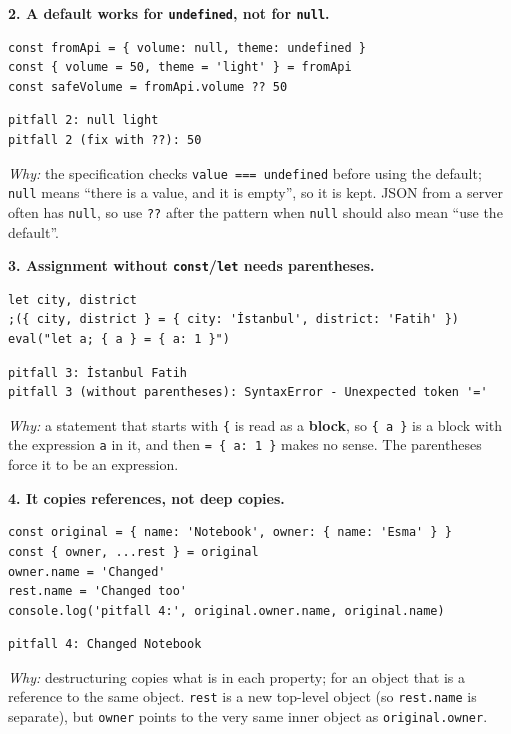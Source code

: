 \documentclass[
  10pt,
]{article}
\begin{document}
\textbf{2. A default works for \texttt{undefined}, not for
\texttt{null}.}

\begin{verbatim}
const fromApi = { volume: null, theme: undefined }
const { volume = 50, theme = 'light' } = fromApi
const safeVolume = fromApi.volume ?? 50
\end{verbatim}

\begin{verbatim}
pitfall 2: null light
pitfall 2 (fix with ??): 50
\end{verbatim}

\emph{Why:} the specification checks \texttt{value\ ===\ undefined}
before using the default; \texttt{null} means ``there is a value, and it
is empty'', so it is kept. JSON from a server often has \texttt{null},
so use \texttt{??} after the pattern when \texttt{null} should also mean
``use the default''.

\textbf{3. Assignment without \texttt{const}/\texttt{let} needs
parentheses.}

\begin{verbatim}
let city, district
;({ city, district } = { city: 'İstanbul', district: 'Fatih' })
eval("let a; { a } = { a: 1 }")
\end{verbatim}

\begin{verbatim}
pitfall 3: İstanbul Fatih
pitfall 3 (without parentheses): SyntaxError - Unexpected token '='
\end{verbatim}

\emph{Why:} a statement that starts with \texttt{\{} is read as a
\textbf{block}, so \texttt{\{\ a\ \}} is a block with the expression
\texttt{a} in it, and then \texttt{=\ \{\ a:\ 1\ \}} makes no sense. The
parentheses force it to be an expression.

\textbf{4. It copies references, not deep copies.}

\begin{verbatim}
const original = { name: 'Notebook', owner: { name: 'Esma' } }
const { owner, ...rest } = original
owner.name = 'Changed'
rest.name = 'Changed too'
console.log('pitfall 4:', original.owner.name, original.name)
\end{verbatim}

\begin{verbatim}
pitfall 4: Changed Notebook
\end{verbatim}

\emph{Why:} destructuring copies what is in each property; for an object
that is a reference to the same object. \texttt{rest} is a new top-level
object (so \texttt{rest.\allowbreak{}name} is separate), but
\texttt{owner} points to the very same inner object as
\texttt{original.\allowbreak{}owner}.
\end{document}
